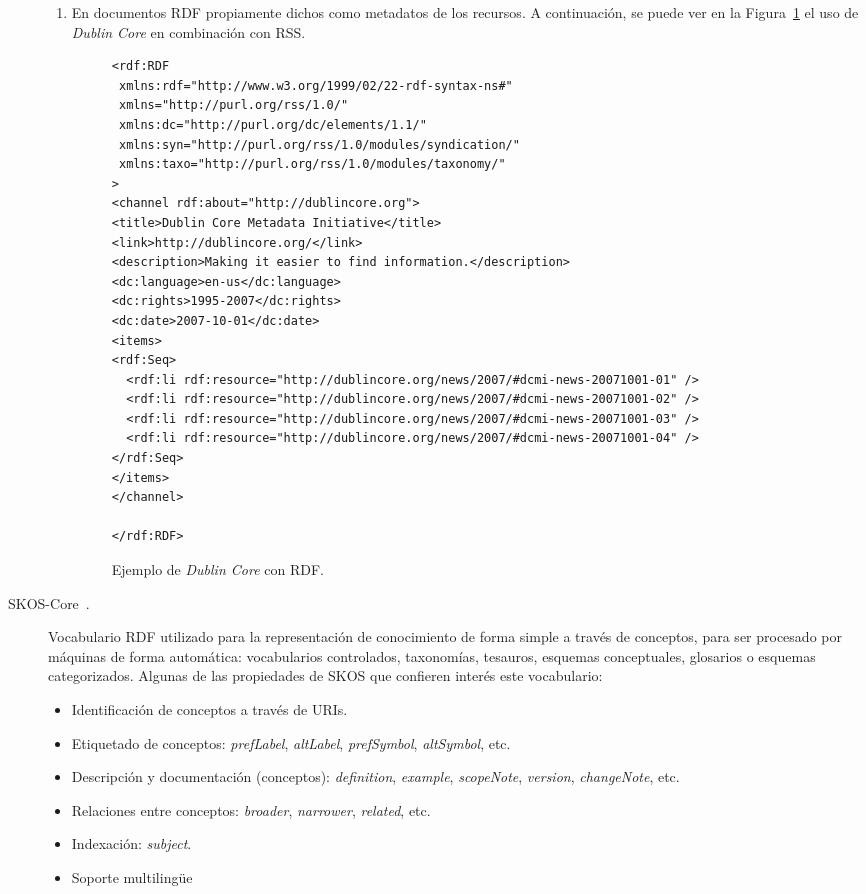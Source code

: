 \begin{description}
\begin{enumerate}
\item En documentos RDF propiamente dichos como metadatos de los recursos. A
continuación, se puede ver en la Figura~\ref{fig:rdf-dc-example} el uso de \textit{Dublin Core} en combinación con \gls{RSS}.

\begin{figure}[!htbp]
\centering
\begin{lstlisting}
<rdf:RDF
 xmlns:rdf="http://www.w3.org/1999/02/22-rdf-syntax-ns#"
 xmlns="http://purl.org/rss/1.0/"
 xmlns:dc="http://purl.org/dc/elements/1.1/"
 xmlns:syn="http://purl.org/rss/1.0/modules/syndication/"
 xmlns:taxo="http://purl.org/rss/1.0/modules/taxonomy/"
>
<channel rdf:about="http://dublincore.org">
<title>Dublin Core Metadata Initiative</title>
<link>http://dublincore.org/</link>
<description>Making it easier to find information.</description>
<dc:language>en-us</dc:language>
<dc:rights>1995-2007</dc:rights>
<dc:date>2007-10-01</dc:date>
<items>
<rdf:Seq>
  <rdf:li rdf:resource="http://dublincore.org/news/2007/#dcmi-news-20071001-01" />
  <rdf:li rdf:resource="http://dublincore.org/news/2007/#dcmi-news-20071001-02" />
  <rdf:li rdf:resource="http://dublincore.org/news/2007/#dcmi-news-20071001-03" />
  <rdf:li rdf:resource="http://dublincore.org/news/2007/#dcmi-news-20071001-04" />
</rdf:Seq>
</items>
</channel>

</rdf:RDF>
 \end{lstlisting} 
\label{fig:rdf-dc-example}
\caption{Ejemplo de \textit{Dublin Core} con RDF.}
\end{figure}

\end{enumerate}

\item[\gls{SKOS}-Core~\cite{SKOS-Core}.] Vocabulario RDF utilizado para la representación de conocimiento 
de forma simple a través de conceptos, para ser procesado por máquinas de forma
automática: vocabularios controlados, taxonomías, tesauros, esquemas
conceptuales, glosarios o esquemas categorizados. Algunas de las propiedades de SKOS que 
confieren interés este vocabulario:
\begin{itemize}
\item Identificación de conceptos a través de URIs.
\item  Etiquetado de conceptos: \textit{prefLabel}, \textit{altLabel},
\textit{prefSymbol}, \textit{altSymbol}, etc.
\item Descripción y documentación (conceptos): \textit{definition}, \textit{example}, \textit{scopeNote},
\textit{version}, \textit{changeNote}, etc.
\item Relaciones entre conceptos: \textit{broader}, \textit{narrower},
\textit{related}, etc. 
\item Indexación: \textit{subject}.
\item Soporte multiling\"{u}e
\end{itemize}


\end{description}
